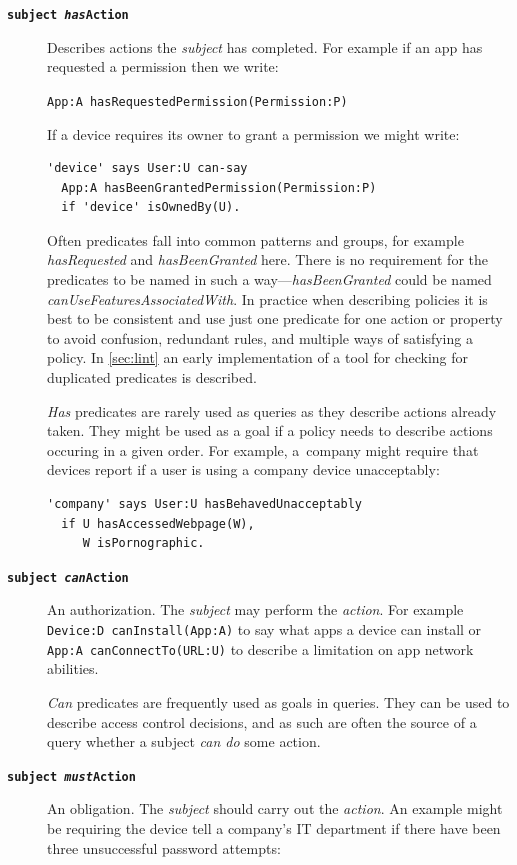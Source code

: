 \documentclass[thesis.tex]{subfiles}
\begin{document}
\begin{description}
\item[\bfseries\texttt{subject \emph{has}Action}]
  Describes actions the \emph{subject} has completed.
  For example if an app has requested a permission then we write:

  \lstinline!App:A hasRequestedPermission(Permission:P)!

  If a device requires its owner to grant a permission we might write:
  \begin{lstlisting}
'device' says User:U can-say
  App:A hasBeenGrantedPermission(Permission:P)
  if 'device' isOwnedBy(U).
  \end{lstlisting}

  Often predicates fall into common patterns and groups, for example
  \emph{hasRequested} and \emph{hasBeenGranted} here.  There is no requirement
  for the predicates to be named in such a way---\emph{hasBeenGranted} could be
  named \emph{canUseFeaturesAssociatedWith}.  In practice when describing
  policies it is best to be consistent and use just one predicate for one action
  or property to avoid confusion, redundant rules, and multiple ways of
  satisfying a policy.  In \autoref{sec:lint} an early implementation of a tool
  for checking for duplicated predicates is described.

  \emph{Has} predicates are rarely used as queries as they describe actions
  already taken.  They might be used as a goal if a policy needs to describe
  actions occuring in a given order.  For example, a~company might require that
  devices report if a user is using a company device unacceptably:

  \begin{lstlisting}
'company' says User:U hasBehavedUnacceptably
  if U hasAccessedWebpage(W),
     W isPornographic.
  \end{lstlisting}

\item[\bfseries\texttt{subject \emph{can}Action}]
  An authorization.
  The \emph{subject} may perform the \emph{action}.
  For example \lstinline!Device:D canInstall(App:A)! to say what apps a device can install or \lstinline!App:A canConnectTo(URL:U)! to describe a limitation on app network abilities.

  \emph{Can} predicates are frequently used as goals in queries.  They can be
  used to describe access control decisions, and as such are often the source of
  a query whether a subject \emph{can do} some action.

\item[\bfseries\texttt{subject \emph{must}Action}]
  An obligation.  The \emph{subject} should carry out the \emph{action}.
  An example might be requiring the device tell a company's IT department if there have been three unsuccessful password attempts:


\end{description}
\end{document}
